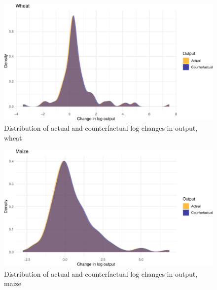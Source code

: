 \documentclass[
]{article}
\begin{document}
\begin{landscape}
\begin{figure}
\includegraphics{draft_files/figure-latex/yield9counterfactual2-1} \caption[Distribution of actual and counterfactual log changes in output, wheat]{Distribution of actual and counterfactual log changes in output, wheat}\label{fig:yield9counterfactual2}
\end{figure}
\end{landscape}

\FloatBarrier
\newpage

\begin{landscape}
\begin{figure}
\includegraphics{draft_files/figure-latex/yield9counterfactual3-1} \caption[Distribution of actual and counterfactual log changes in output, maize]{Distribution of actual and counterfactual log changes in output, maize}\label{fig:yield9counterfactual3}
\end{figure}
\end{landscape}
\end{document}
